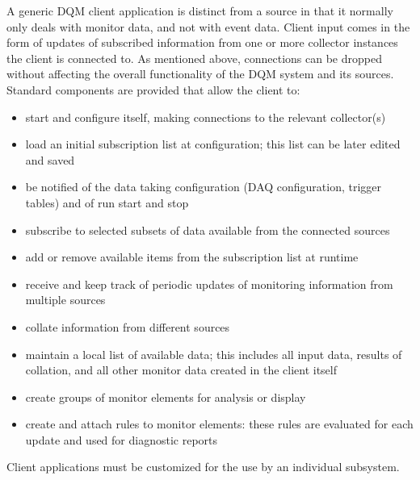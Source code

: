 \documentclass[a4paper]{cmspaper}
\begin{document}
A generic DQM client application is distinct from a source in that
it normally only deals with monitor data, and not with event data. Client input
comes in the form of updates of subscribed information from one or more collector
instances the client is connected to. As mentioned above, connections can be dropped
without affecting the overall functionality of the DQM system and its sources.
Standard components are provided that allow the client to:
\begin{itemize}
\item{start and configure itself, making connections to the relevant collector(s)}
\item{load an initial subscription list at configuration; this list can be
later edited and saved}
\item{be notified of the data taking configuration (DAQ configuration, trigger tables)
and of run start and stop}
\item{subscribe to selected subsets of data available from the connected sources}
\item{add or remove available items from the subscription list at runtime}
\item{receive and keep track of periodic updates of monitoring information from
multiple sources}
\item{collate information from different sources}
\item{maintain a local list of available data; this includes all input data, results
of collation, and all other monitor data created in the client itself}
\item{create groups of monitor elements for analysis or display}
\item{create and attach rules to monitor elements: these rules are evaluated for
each update and used for diagnostic reports}
\end{itemize}
Client applications must be customized for the use by an individual subsystem.

%
%
%
\end{document}

